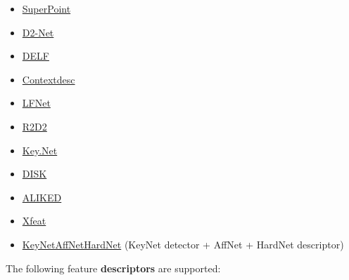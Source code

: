 \documentclass{article}
\begin{document}
\begin{itemize}
    \item \href{https://github.com/MagicLeapResearch/SuperPointPretrainedNetwork}{SuperPoint}
    \item \href{https://github.com/mihaidusmanu/d2-net}{D2-Net} \cite{dusmanu2019d2}
    \item \href{https://github.com/tensorflow/models/tree/master/research/delf}{DELF} \cite{noh2017large}
    \item \href{https://github.com/lzx551402/contextdesc}{Contextdesc} \cite{luo2020contextdesc}
    \item \href{https://github.com/vcg-uvic/lf-net-release}{LFNet} \cite{ono2018lf}
    \item \href{https://github.com/naver/r2d2}{R2D2} \cite{revaud2019r2d2}
    \item \href{https://github.com/axelBarroso/Key.Net}{Key.Net} \cite{barroso2020key}
    \item \href{https://arxiv.org/abs/2006.13566}{DISK} \cite{tyszkiewicz2020disk}
    \item \href{https://arxiv.org/abs/2304.03608}{ALIKED} \cite{barroso2023alike}
    \item \href{https://arxiv.org/abs/2404.19174}{Xfeat} \cite{barroso2024xfeat}
    \item \href{https://github.com/axelBarroso/Key.Net}{KeyNetAffNetHardNet} (KeyNet detector + AffNet + HardNet descriptor)
\end{itemize}

The following feature \textbf{descriptors} are supported: 
\end{document}
